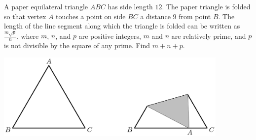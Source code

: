 A paper equilateral triangle $ABC$ has side length $12$. The paper triangle is folded so that vertex $A$ touches a point on side $\overline{BC}$ a distance $9$ from point $B$. The length of the line segment along which the triangle is folded can be written as $\frac{m\sqrt{p}}{n}$, where $m$, $n$, and $p$ are positive integers, $m$ and $n$ are relatively prime, and $p$ is not divisible by the square of any prime. Find $m+n+p$.
\begin{center}
\includegraphics[width = 113.60000000000001mm]{img/fig0.png}
\end{center}